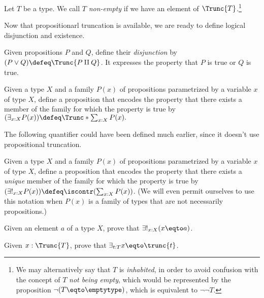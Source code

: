 \begin{definition}\label{def:non-empty}
  Let $T$ be a type.
  We call $T$ \emph{non-empty}
  if we have an element of $\Trunc{T}$.\footnote{%
    We may alternatively say that $T$ is \emph{inhabited},
    in order to avoid confusion with the
    concept of $T$ \emph{not being empty},
    which would be represented by the proposition
    $\neg(T \eqto \emptytype)$, which is equivalent to
    $\neg\neg T$.}
\end{definition}

Now that propositionarl truncation is available, we are ready to define logical disjunction and existence.

\begin{definition}
  Given propositions $P$ and $Q$, define their \emph{disjunction} by  $(P \vee Q) \defeq \Trunc{P \amalg Q}$.
  It expresses the property that $P$ is true or $Q$ is true.
\end{definition}

\begin{definition}
  Given a type $X$ and a family $P(x)$ of propositions parametrized by a variable $x$ of type $X$,
  define a proposition that encodes the property that there exists a member of the family for which
  the property is true by $(\exists_{x:X} P(x)) \defeq \Trunc*{\sum_{x:X} P(x)}.$
\end{definition}

The following quantifier could have been defined much earlier, since it doesn't use propositional truncation.

\begin{definition}
  Given a type $X$ and a family $P(x)$ of propositions parametrized by a variable $x$ of type $X$,
  define a proposition that encodes the property that there exists a \emph{unique} member of the family for which
  the property is true by $(\exists!_{x:X} P(x)) \defeq \iscontr({\sum_{x:X} P(x)})$.
  (We will even permit ourselves to use this notation when $P(x)$ is a family of types that are not necessarily propositions.)
\end{definition}

\begin{xca}
  Given an element $a$ of a type $X$, prove that $\exists!_{x:X} ( x \eqto a )$.
\end{xca}

\begin{xca}
  Given $x:\Trunc{T}$, prove that $\exists_{t:T} x \eqto \trunc{t}$.
\end{xca}

